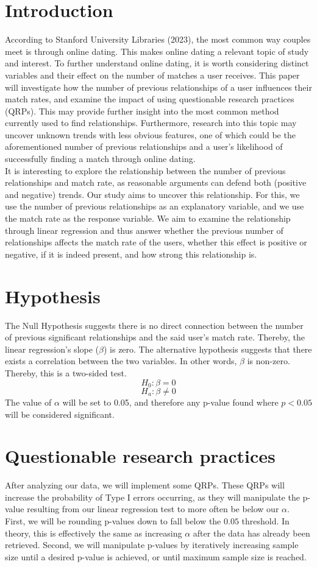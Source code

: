 \documentclass[12pt]{article}
\begin{document}
\section{Introduction}
    According to Stanford University Libraries (2023)\cite{rosenfeld2023}, the most common way couples meet is through online dating. This makes online dating a relevant topic of study and interest. To further understand online dating, it is worth considering distinct variables and their effect on the number of matches a user receives. This paper will investigate how the number of previous relationships of a user influences their match rates, and examine the impact of using questionable research practices (QRPs). This may provide further insight into the most common method currently used to find relationships. Furthermore, research into this topic may uncover unknown trends with less obvious features, one of which could be the aforementioned number of previous relationships and a user’s likelihood of successfully finding a match through online dating. \\
    It is interesting to explore the relationship between the number of previous relationships and match rate, as reasonable arguments can defend both (positive and negative) trends. Our study aims to uncover this relationship. For this, we use the number of previous relationships as an explanatory variable, and we use the match rate as the response variable. We aim to examine the relationship through linear regression and thus answer whether the previous number of relationships affects the match rate of the users, whether this effect is positive or negative, if it is indeed present, and how strong this relationship is. 

\section{Hypothesis}
    The Null Hypothesis suggests there is no direct connection between the number of previous significant relationships and the said user's match rate. Thereby, the linear regression’s slope ($\beta$) is zero. The alternative hypothesis suggests that there exists a correlation between the two variables. In other words, $\beta$ is non-zero. Thereby, this is a two-sided test.
    \[
    H_0: \beta = 0
    \]
    \[
    H_a: \beta \neq 0
    \]
    The value of $\alpha$ will be set to 0.05, and therefore any p-value found where $p<0.05$ will be considered significant.

\section{Questionable research practices}
    After analyzing our data, we will implement some QRPs. These QRPs will increase the probability of Type I errors occurring, as they will manipulate the p-value resulting from our linear regression test to more often be below our $\alpha$. First, we will be rounding p-values down to fall below the $0.05$ threshold. In theory, this is effectively the same as increasing $\alpha$ after the data has already been retrieved. Second, we will manipulate p-values by iteratively increasing sample size until a desired p-value is achieved, or until maximum sample size is reached. 
\end{document}
